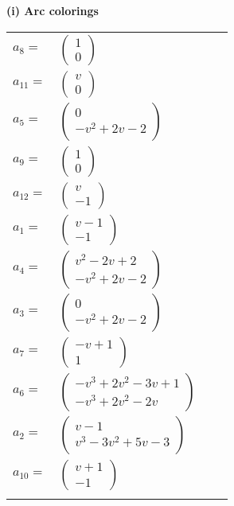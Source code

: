 \documentclass[1p]{elsarticle_modified}
\theoremstyle{definition}
\begin{document}
\flushleft \textbf{(i) Arc colorings}\\
\begin{tabular}{m{7pt} m{180pt} m{7pt} m{180pt} }
\flushright $a_{8}=$&$\begin{pmatrix}1\\0\end{pmatrix}$ \\
\flushright $a_{11}=$&$\begin{pmatrix}v\\0\end{pmatrix}$ \\
\flushright $a_{5}=$&$\begin{pmatrix}0\\- v^2+2 v-2\end{pmatrix}$ \\
\flushright $a_{9}=$&$\begin{pmatrix}1\\0\end{pmatrix}$ \\
\flushright $a_{12}=$&$\begin{pmatrix}v\\-1\end{pmatrix}$ \\
\flushright $a_{1}=$&$\begin{pmatrix}v-1\\-1\end{pmatrix}$ \\
\flushright $a_{4}=$&$\begin{pmatrix}v^2-2 v+2\\- v^2+2 v-2\end{pmatrix}$ \\
\flushright $a_{3}=$&$\begin{pmatrix}0\\- v^2+2 v-2\end{pmatrix}$ \\
\flushright $a_{7}=$&$\begin{pmatrix}- v+1\\1\end{pmatrix}$ \\
\flushright $a_{6}=$&$\begin{pmatrix}- v^3+2 v^2-3 v+1\\- v^3+2 v^2-2 v\end{pmatrix}$ \\
\flushright $a_{2}=$&$\begin{pmatrix}v-1\\v^3-3 v^2+5 v-3\end{pmatrix}$ \\
\flushright $a_{10}=$&$\begin{pmatrix}v+1\\-1\end{pmatrix}$\\&\end{tabular}
\end{document}
